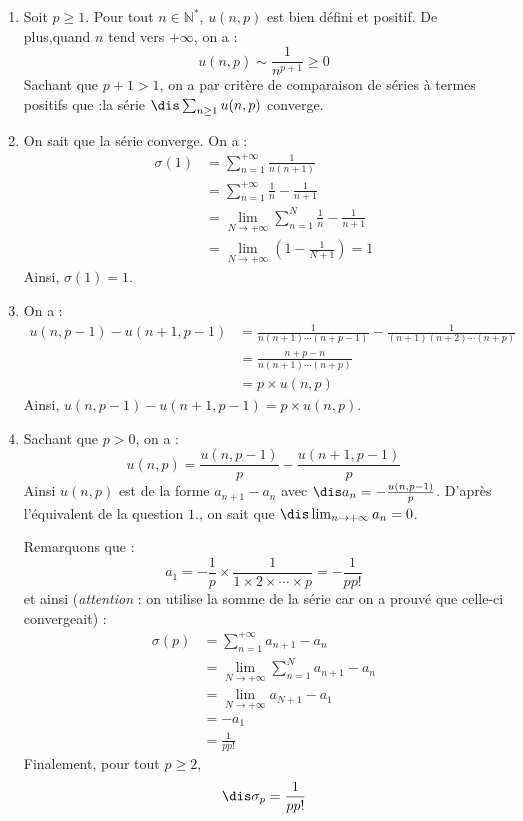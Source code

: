 \documentclass[a4paper,10pt]{report}
\begin{document}
\corr \begin{enumerate}
\item Soit $p \geq 1$. Pour tout $n \in \mathbb{N}^*$, $u(n,p)$ est bien défini et positif. De plus,quand $n$ tend vers $+ \infty$, on a :
$$u(n,p)\sim \frac{1}{n^{p+1}} \geq 0$$
Sachant que $p+1>1$, on a par critère de comparaison de séries à termes positifs que :la s\'erie $\dis \sum_{n \geq 1} u(n,p)$ converge.

\item  On sait que la s\'erie converge. On a : 
\begin{align*}
\sigma (1)& =\sum_{n=1}^{+\infty }\frac{1}{n(n+1)} \\
& =\sum_{n=1}^{+\infty }\frac{1}{n}-\frac{1}{n+1} \\
& = \lim_{N \rightarrow + \infty} \sum_{n=1}^{N}\frac{1}{n}-\frac{1}{n+1} \\
& =\lim_{N \rightarrow +\infty }\left(1- \frac{1}{N+1}\right) =1 
\end{align*}
Ainsi, $\sigma(1)=1$.
\item On a :
\begin{align*}
u(n,p-1)-u(n+1,p-1) & =\frac{1}{n(n+1)\cdots (n+p-1)}-\frac{1}{(n+1)(n+2)\cdots
(n+p)} \\
& =\frac{n+p-n}{n(n+1)\cdots (n+p)} \\
& =p \times u(n,p) 
\end{align*}
Ainsi, $u(n,p-1)-u(n+1,p-1)=p \times u(n,p)$.
\item Sachant que $p>0$, on a :
\[
u(n,p)=\frac{u(n,p-1)}{p}-\frac{u(n+1,p-1)}{p} 
\]
Ainsi $u(n,p)$ est de la forme $a_{n+1}-a_n$ avec $ \dis a_n=-\frac{u(n,p-1)}{p}$. D'apr\`es l'\'equivalent de la question $1.$,  on sait que $\dis \lim_{n \rightarrow + \infty} a_{n}=0$. 

\medskip

\noindent Remarquons que : 
$$a_{1}=-\frac{1}{p} \times \frac{1}{1 \times 2 \times \cdots \times p}=-\frac{1}{pp!}$$ 
et ainsi (\textit{attention} : on utilise la somme de la série car on a prouvé que celle-ci convergeait) :
\begin{align*}
\sigma(p) & = \sum_{n=1}^{+ \infty} a_{n+1}-a_n \\
& = \lim_{N \rightarrow + \infty}  \sum_{n=1}^{N} a_{n+1}-a_n \\
& = \lim_{N \rightarrow + \infty} a_{N+1} - a_1 \\
& = - a_1 \\
& = \frac{1}{pp!} 
\end{align*}
Finalement, pour tout $p \geq 2$,
$$\dis \sigma _{p}=\frac{1}{pp!}$$
\end{enumerate}
\end{document}
